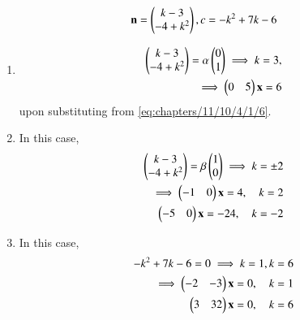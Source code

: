 \begin{align}
\mathbf{n} = \begin{pmatrix}k-3\\-4+k^2\end{pmatrix}, c  = -k^2+7k-6
\label{eq:chapters/11/10/4/1/6}
\end{align}
\begin{enumerate}
    \item 
\begin{align}
\begin{pmatrix}k-3\\-4+k^2\end{pmatrix} =\alpha\begin{pmatrix}0\\1\end{pmatrix}
\implies
k =3,
\\
\implies        \begin{pmatrix}0 & 5\end{pmatrix}\mathbf{x} =6
\end{align}
upon substituting from 
\eqref{eq:chapters/11/10/4/1/6}.

\item In this case, 
\begin{align}
\begin{pmatrix}k-3\\-4+k^2\end{pmatrix} =\beta\begin{pmatrix}1\\0\end{pmatrix}
	\implies k =\pm2
	\\
	\implies
        \begin{pmatrix}-1 & 0\end{pmatrix}\mathbf{x} =4, \quad  k =2\\
        \begin{pmatrix}-5 & 0\end{pmatrix}\mathbf{x} =-24, \quad  k =-2
\end{align}
\item 
	In this case, 
\begin{align}
	-k^2+7k-6 = 0
	\implies k =1,  k=6
	\\
	\implies
        \begin{pmatrix}-2 & -3\end{pmatrix}\mathbf{x} =0, \quad  k =1\\
       \begin{pmatrix}3 & 32\end{pmatrix}\mathbf{x} =0, \quad  k =6
\end{align}
\end{enumerate}
